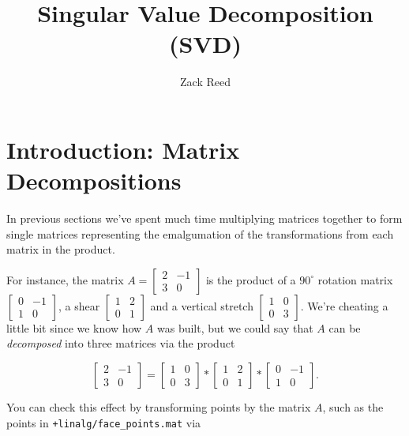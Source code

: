 \documentclass{ximera}
\author{Zack Reed}
\title{Singular Value Decomposition (SVD)}
\begin{document}
\begin{abstract}

\end{abstract}
\maketitle

\section*{Introduction: Matrix Decompositions}
In previous sections we've spent much time multiplying matrices together to form single matrices representing the emalgumation of the transformations from each matrix in the product. 

For instance, the matrix $A=\begin{bmatrix} 2 & -1 \\ 3 & 0\end{bmatrix}$ is the product of a $90^\circ$ rotation matrix $\begin{bmatrix}0 & -1\\ 1 & 0\end{bmatrix}$, a shear $\begin{bmatrix} 1 & 2 \\ 0 & 1\end{bmatrix}$ and a vertical stretch $\begin{bmatrix} 1 & 0 \\ 0 & 3\end{bmatrix}$. We're cheating a little bit since we know how $A$ was built, but we could say that $A$ can be \emph{decomposed} into three matrices via the product 

$$\begin{bmatrix} 2 & -1 \\ 3 & 0\end{bmatrix}=\begin{bmatrix} 1 & 0 \\ 0 & 3\end{bmatrix}*\begin{bmatrix} 1 & 2 \\ 0 & 1\end{bmatrix}*\begin{bmatrix}0 & -1\\ 1 & 0\end{bmatrix}.$$

You can check this effect by transforming points by the matrix $A$, such as the points in \texttt{+linalg/face\_points.mat} via
\end{document}
